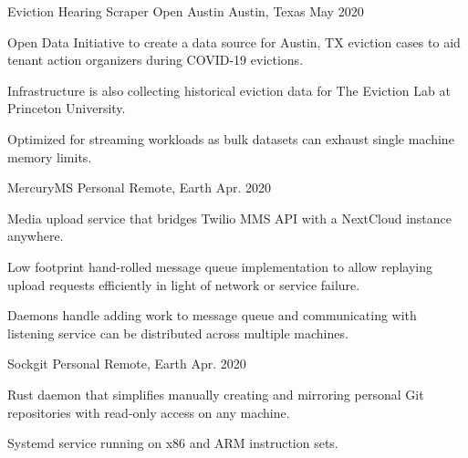 
\begin{cventries}
	
	\cventry
		{Eviction Hearing Scraper} %
		{Open Austin} %
		{Austin, Texas} %
		{May 2020} %
		{
			\begin{cvitems} %
				\item {Open Data Initiative to create a data source for Austin, TX eviction cases to aid tenant action organizers during COVID-19 evictions.}
				\item {Infrastructure is also collecting historical eviction data for The Eviction Lab at Princeton University.}
				\item {Optimized for streaming workloads as bulk datasets can exhaust single machine memory limits.}
			\end{cvitems}
		}

	\cventry
		{MercuryMS} %
		{Personal} %
		{Remote, Earth} %
		{Apr. 2020} %
		{
			\begin{cvitems} %
				\item {Media upload service that bridges Twilio MMS API with a NextCloud instance anywhere.}
				\item {Low footprint hand-rolled message queue implementation to allow replaying upload requests efficiently in light of network or service failure.}
				\item {Daemons handle adding work to message queue and communicating with listening service can be distributed across multiple machines.}
			\end{cvitems}
		}

	\cventry
		{Sockgit} %
		{Personal} %
		{Remote, Earth} %
		{Apr. 2020} %
		{
			\begin{cvitems} %
				\item {Rust daemon that simplifies manually creating and mirroring personal Git repositories with read-only access on any machine.}
				\item {Systemd service running on x86 and ARM instruction sets.}
			\end{cvitems}
		}


\end{cventries}
